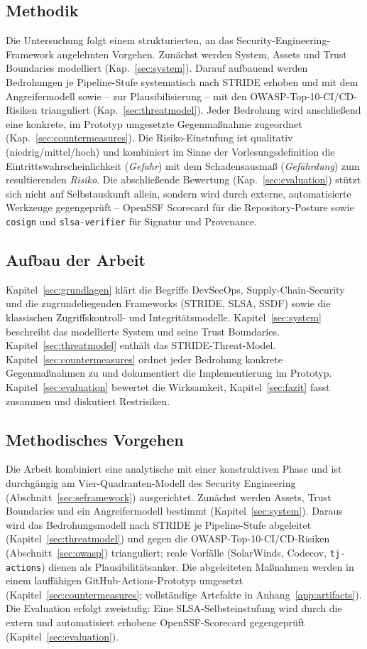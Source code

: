 \documentclass[12pt, a4paper]{scrartcl}
\begin{document}
\subsection{Methodik}
Die Untersuchung folgt einem strukturierten, an das
Security-Engineering-Framework angelehnten Vorgehen. Zunächst werden
System, Assets und Trust Boundaries modelliert
(Kap.~\ref{sec:system}). Darauf aufbauend werden Bedrohungen je
Pipeline-Stufe systematisch nach STRIDE erhoben und mit dem
Angreifermodell sowie -- zur Plausibilisierung -- mit den
OWASP-Top-10-CI/CD-Risiken trianguliert (Kap.~\ref{sec:threatmodel}).
Jeder Bedrohung wird anschließend eine konkrete, im Prototyp umgesetzte
Gegenmaßnahme zugeordnet (Kap.~\ref{sec:countermeasures}). Die
Risiko-Einstufung ist qualitativ (niedrig/mittel/hoch) und kombiniert im
Sinne der Vorlesungsdefinition die Eintrittswahrscheinlichkeit
(\emph{Gefahr}) mit dem Schadensausmaß (\emph{Gefährdung}) zum
resultierenden \emph{Risiko}. Die abschließende Bewertung
(Kap.~\ref{sec:evaluation}) stützt sich nicht auf Selbstauskunft allein,
sondern wird durch externe, automatisierte Werkzeuge gegengeprüft --
OpenSSF Scorecard für die Repository-Posture sowie \texttt{cosign} und
\texttt{slsa-verifier} für Signatur und Provenance.

\subsection{Aufbau der Arbeit}
Kapitel~\ref{sec:grundlagen} klärt die Begriffe DevSecOps, Supply-Chain-Security
und die zugrundeliegenden Frameworks (STRIDE, SLSA, SSDF) sowie die
klassischen Zugriffskontroll- und Integritätsmodelle. Kapitel~\ref{sec:system}
beschreibt das modellierte System und seine Trust Boundaries.
Kapitel~\ref{sec:threatmodel} enthält das STRIDE-Threat-Model.
Kapitel~\ref{sec:countermeasures} ordnet jeder Bedrohung konkrete
Gegenmaßnahmen zu und dokumentiert die Implementierung im Prototyp.
Kapitel~\ref{sec:evaluation} bewertet die Wirksamkeit, Kapitel~\ref{sec:fazit}
fasst zusammen und diskutiert Restrisiken.

\subsection{Methodisches Vorgehen}
Die Arbeit kombiniert eine analytische mit einer konstruktiven Phase und
ist durchgängig am Vier-Quadranten-Modell des Security Engineering
(Abschnitt~\ref{sec:seframework}) ausgerichtet. Zunächst werden Assets,
Trust Boundaries und ein Angreifermodell bestimmt
(Kapitel~\ref{sec:system}). Daraus wird das Bedrohungsmodell nach STRIDE
je Pipeline-Stufe abgeleitet (Kapitel~\ref{sec:threatmodel}) und gegen
die OWASP-Top-10-CI/CD-Risiken (Abschnitt~\ref{sec:owasp}) trianguliert;
reale Vorfälle (SolarWinds, Codecov, \texttt{tj-actions}) dienen als
Plausibilitätsanker. Die abgeleiteten Maßnahmen werden in einem
lauffähigen GitHub-Actions-Prototyp umgesetzt
(Kapitel~\ref{sec:countermeasures}; vollständige Artefakte in
Anhang~\ref{app:artifacts}). Die Evaluation erfolgt zweistufig: Eine
SLSA-Selbsteinstufung wird durch die extern und automatisiert erhobene
OpenSSF-Scorecard gegengeprüft (Kapitel~\ref{sec:evaluation}).
\end{document}
